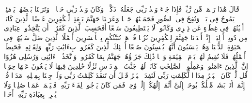 \startbuffer[\q:18:98]
قَالَ هَٰذَا رَحۡمَةࣱ مِّن رَّبِّیۖ فَإِذَا جَاۤءَ وَعۡدُ رَبِّی جَعَلَهُۥ دَكَّاۤءَۖ وَكَانَ وَعۡدُ رَبِّی حَقࣰّا%
\stopbuffer%
\startbuffer[\q:18:99]
۞ وَتَرَكۡنَا بَعۡضَهُمۡ یَوۡمَئِذࣲ یَمُوجُ فِی بَعۡضࣲۖ وَنُفِخَ فِی ٱلصُّورِ فَجَمَعۡنَٰهُمۡ جَمۡعࣰا%
\stopbuffer%
\startbuffer[\q:18:100]
وَعَرَضۡنَا جَهَنَّمَ یَوۡمَئِذࣲ لِّلۡكَٰفِرِینَ عَرۡضًا%
\stopbuffer%
\startbuffer[\q:18:101]
ٱلَّذِینَ كَانَتۡ أَعۡیُنُهُمۡ فِی غِطَاۤءٍ عَن ذِكۡرِی وَكَانُوا۟ لَا یَسۡتَطِیعُونَ سَمۡعًا%
\stopbuffer%
\startbuffer[\q:18:102]
أَفَحَسِبَ ٱلَّذِینَ كَفَرُوۤا۟ أَن یَتَّخِذُوا۟ عِبَادِی مِن دُونِیۤ أَوۡلِیَاۤءَۚ إِنَّاۤ أَعۡتَدۡنَا جَهَنَّمَ لِلۡكَٰفِرِینَ نُزُلࣰا%
\stopbuffer%
\startbuffer[\q:18:103]
قُلۡ هَلۡ نُنَبِّئُكُم بِٱلۡأَخۡسَرِینَ أَعۡمَٰلًا%
\stopbuffer%
\startbuffer[\q:18:104]
ٱلَّذِینَ ضَلَّ سَعۡیُهُمۡ فِی ٱلۡحَیَوٰةِ ٱلدُّنۡیَا وَهُمۡ یَحۡسَبُونَ أَنَّهُمۡ یُحۡسِنُونَ صُنۡعًا%
\stopbuffer%
\startbuffer[\q:18:105]
أُو۟لَٰۤئِكَ ٱلَّذِینَ كَفَرُوا۟ بِءَایَٰتِ رَبِّهِمۡ وَلِقَاۤئِهِۦ فَحَبِطَتۡ أَعۡمَٰلُهُمۡ فَلَا نُقِیمُ لَهُمۡ یَوۡمَ ٱلۡقِیَٰمَةِ وَزۡنࣰا%
\stopbuffer%
\startbuffer[\q:18:106]
ذَٰلِكَ جَزَاۤؤُهُمۡ جَهَنَّمُ بِمَا كَفَرُوا۟ وَٱتَّخَذُوۤا۟ ءَایَٰتِی وَرُسُلِی هُزُوًا%
\stopbuffer%
\startbuffer[\q:18:107]
إِنَّ ٱلَّذِینَ ءَامَنُوا۟ وَعَمِلُوا۟ ٱلصَّٰلِحَٰتِ كَانَتۡ لَهُمۡ جَنَّٰتُ ٱلۡفِرۡدَوۡسِ نُزُلًا%
\stopbuffer%
\startbuffer[\q:18:108]
خَٰلِدِینَ فِیهَا لَا یَبۡغُونَ عَنۡهَا حِوَلࣰا%
\stopbuffer%
\startbuffer[\q:18:109]
قُل لَّوۡ كَانَ ٱلۡبَحۡرُ مِدَادࣰا لِّكَلِمَٰتِ رَبِّی لَنَفِدَ ٱلۡبَحۡرُ قَبۡلَ أَن تَنفَدَ كَلِمَٰتُ رَبِّی وَلَوۡ جِئۡنَا بِمِثۡلِهِۦ مَدَدࣰا%
\stopbuffer%
\startbuffer[\q:18:110]
قُلۡ إِنَّمَاۤ أَنَا۠ بَشَرࣱ مِّثۡلُكُمۡ یُوحَىٰۤ إِلَیَّ أَنَّمَاۤ إِلَٰهُكُمۡ إِلَٰهࣱ وَٰحِدࣱۖ فَمَن كَانَ یَرۡجُوا۟ لِقَاۤءَ رَبِّهِۦ فَلۡیَعۡمَلۡ عَمَلࣰا صَٰلِحࣰا وَلَا یُشۡرِكۡ بِعِبَادَةِ رَبِّهِۦۤ أَحَدَۢا%
\stopbuffer%
